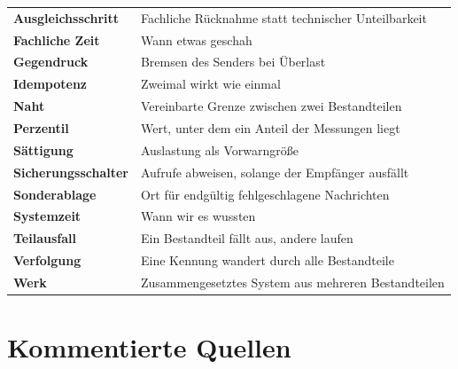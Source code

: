 \begin{merksatz}
\begin{center}
{\small
\renewcommand{\arraystretch}{1.32}
\begin{tabular}{@{}P{3.3cm}P{5.4cm}@{}}
\toprule
\textbf{Ausgleichsschritt} & Fachliche Rücknahme statt technischer Unteilbarkeit\\
\textbf{Fachliche Zeit} & Wann etwas geschah\\
\textbf{Gegendruck} & Bremsen des Senders bei Überlast\\
\textbf{Idempotenz} & Zweimal wirkt wie einmal\\
\textbf{Naht} & Vereinbarte Grenze zwischen zwei Bestandteilen\\
\textbf{Perzentil} & Wert, unter dem ein Anteil der Messungen liegt\\
\textbf{Sättigung} & Auslastung als Vorwarngröße\\
\textbf{Sicherungsschalter} & Aufrufe abweisen, solange der Empfänger ausfällt\\
\textbf{Sonderablage} & Ort für endgültig fehlgeschlagene Nachrichten\\
\textbf{Systemzeit} & Wann wir es wussten\\
\textbf{Teilausfall} & Ein Bestandteil fällt aus, andere laufen\\
\textbf{Verfolgung} & Eine Kennung wandert durch alle Bestandteile\\
\textbf{Werk} & Zusammengesetztes System aus mehreren Bestandteilen\\
\bottomrule
\end{tabular}}
\end{center}
\end{merksatz}

\chapter{Kommentierte Quellen}




